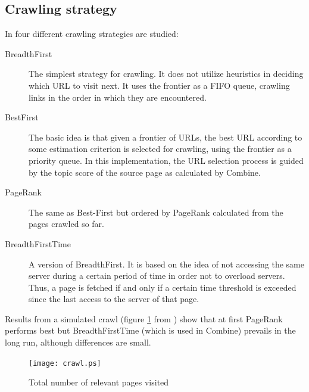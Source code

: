 \subsection{Crawling strategy}

In \cite{Rafael06} four different crawling strategies are studied:
\begin{description}
\item[BreadthFirst]
The simplest strategy for crawling. 
It does not utilize heuristics in deciding which URL to visit next. 
It uses the frontier as a FIFO queue, crawling links in the order in which 
they are encountered.

\item[BestFirst]
The basic idea is that given a frontier of URLs, the best URL
according to some estimation criterion is selected for crawling,
using the frontier as a priority queue.
In this implementation, the URL selection process is guided by 
the topic score of the source page as calculated by Combine.

\item[PageRank] The same as Best-First but ordered by PageRank calculated
from the pages crawled so far.

\item[BreadthFirstTime]
A version of BreadthFirst.
It is based on the idea of not accessing the same server during 
a certain period of time in order not to overload servers.
Thus, a page is fetched if and only if 
a certain time threshold is exceeded 
since the last access to the server of that page.

\end{description}

Results from a simulated crawl (figure \ref{crawlstrategy} from \cite{Rafael06}) show that
at first PageRank performs best but BreadthFirstTime (which is used in Combine) prevails
in the long run, although differences are small.

\begin{figure}[htbp]
\begin{center}
  \texttt{[image: crawl.ps]}
  \caption{Total number of relevant pages visited}
 \label{crawlstrategy}
\end{center}
\end{figure}
